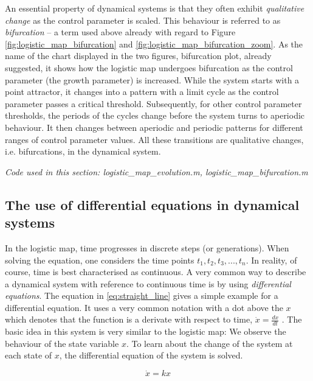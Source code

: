 An essential property of dynamical systems is that they often exhibit \emph{qualitative change} as the control parameter is scaled. This behaviour is referred to as \emph{bifurcation} -- a term used above already with regard to Figure \ref{fig:logistic_map_bifurcation} and \ref{fig:logistic_map_bifurcation_zoom}. As the name of the chart displayed in the two figures, bifurcation plot, already suggested, it shows how the logistic map undergoes bifurcation as the control parameter (the growth parameter) is increased. While the system starts with a point attractor, it changes into a pattern with a limit cycle as the control parameter passes a critical threshold. Subsequently, for other control parameter thresholds, the periods of the cycles change before the system turns to aperiodic behaviour. It then changes between aperiodic and periodic patterns for different ranges of control parameter values. All these transitions are qualitative changes, i.e. bifurcations, in the dynamical system.

\medskip\noindent \textit{Code used in this section: logistic\_map\_evolution.m, logistic\_map\_bifurcation.m}

\subsection{The use of differential equations in dynamical systems}
\label{sec:diff_equations}

In the logistic map, time progresses in discrete steps (or generations). When solving the equation, one considers the time points $t_1, t_2, t_3, ..., t_n$. In reality, of course, time is best characterised as continuous. A very common way to describe a dynamical system with reference to continuous time is by using \emph{differential equations}. The equation in \ref{eq:straight_line} gives a simple example for a differential equation. It uses a very common notation with a dot above the $x$ which denotes that the function is a derivate with respect to time, $\dot{x} = \frac{dx}{dt}$ \citep{Fuchs2013}. The basic idea in this system is very similar to the logistic map: We observe the behaviour of the state variable $x$. To learn about the change of the system at each state of $x$, the differential equation of the system is solved.

\begin{equation}
\dot{x} = kx
\label{eq:straight_line}
\end{equation}

